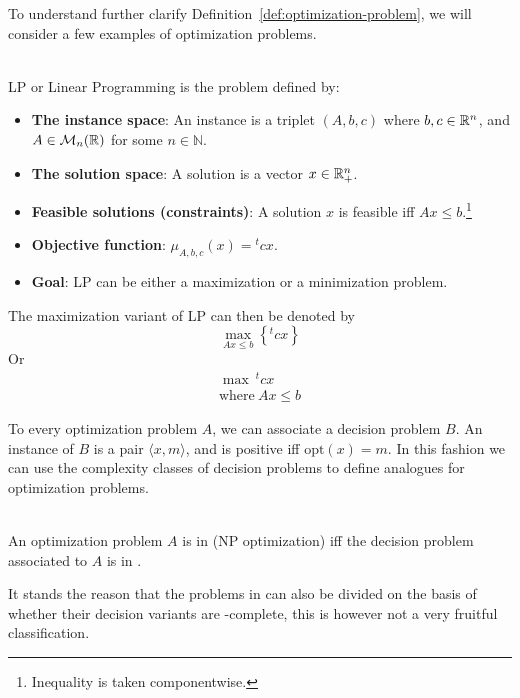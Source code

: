 To understand further clarify Definition~\ref{def:optimization-problem}, we will consider a few examples of optimization problems.

\begin{example}\ \\
    \textsf{LP} or Linear Programming is the problem defined by:
        \begin{itemize}
            \item \textbf{The instance space}: An instance is a triplet \((A, b, c)\) where \(b, c\in\mathbb{R}^n\), and \(A\in\mathcal{M}_n(\mathbb{R})\) for some \(n\in\mathbb{N}\).
            \item \textbf{The solution space}: A solution is a vector \(x\in\mathbb{R}_+^n\).
            \item \textbf{Feasible solutions (constraints)}: A solution \(x\) is feasible iff \(Ax\le b\).\footnote{Inequality is taken componentwise.}
            \item \textbf{Objective function}: \(\mu_{A,b,c}(x)={}^tcx\).
            \item \textbf{Goal}: \textsf{LP} can be either a maximization or a minimization problem.
        \end{itemize}
        The maximization variant of \textsf{LP} can then be denoted by
        \[\max\limits_{Ax\le b}\left\{^tcx\right\}\]
        Or
        \begin{align*}
            \max{\ {}^tcx}\\
            \mathrm{where\ } Ax \le b
        \end{align*}

    \end{example}
    To every optimization problem \(A\), we can associate a decision problem \(B\). An instance of \(B\) is a pair \(\langle x, m\rangle\), and is positive iff \(\mathrm{opt}(x)=m\). In this fashion we can use the complexity classes of decision problems to define analogues for optimization problems.

    \begin{definition}[NPO]\ \\
        An optimization problem \(A\) is in \classNPO{} (NP optimization) iff the decision problem associated to \(A\) is in \classNP.
    \end{definition}

    It stands the reason that the problems in \classNPO{} can also be divided on the basis of whether their decision variants are \classNP-complete, this is however not a very fruitful classification. 
    
